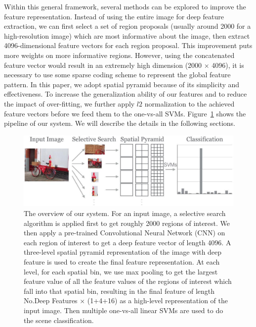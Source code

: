 Within this general framework, several methods can be explored to improve the
feature representation. Instead of using the entire image for deep feature
extraction, we can first select a set of region proposals (usually around 2000
for a high-resolution image) which are most informative about the image, then
extract 4096-dimensional feature vectors for each region proposal. This
improvement puts more weights on more informative regions. However, using the
concatenated feature vector would result in an extremely high dimension (2000
$\times$ 4096), it is necessary to use some sparse coding scheme to represent
the global feature pattern. In this paper, we adopt spatial pyramid because of
its simplicity and effectiveness. To increase the generalization ability of our
features and to reduce the impact of over-fitting, we further apply $l2$
normalization to the achieved feature vectors before we feed them to the
one-vs-all SVMs. Figure~\ref{fig:system_overview} shows the pipeline of our
system. We will describe the details in the following sections.

\begin{figure}[ht]
  \centering
  \includegraphics[scale=0.42]{img/overview.pdf}
  \centering
  \caption{The overview of our system. For an input image, a selective search
  algorithm is applied first to get roughly 2000 regions of interest. We then
  apply a pre-trained Convolutional Neural Network (CNN) on each region of
  interest to get a deep feature vector of length 4096. A three-level spatial
  pyramid representation of the image with deep feature is used to create the
  final feature representation. At each level, for each spatial bin, we use max
  pooling to get the largest feature value of all the feature values of the
  regions of interest which fall into that spatial bin, resulting in the final
  feature of length No.Deep Features $\times$ (1+4+16) as a high-level
  representation of the input image. Then multiple one-vs-all linear SVMs are
  used to do the scene classification.} \label{fig:system_overview}
\end{figure}

